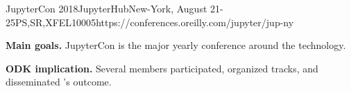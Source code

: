 \begin{event}{JupyterCon 2018}{JupyterHub}{New-York, August 21-25}{PS,SR,XFEL}{1000}{5}{https://conferences.oreilly.com/jupyter/jup-ny}

  \textbf{Main goals.} JupyterCon is the major yearly conference
  around the \Jupyter technology.

  \textbf{ODK implication.} Several \ODK members participated,
  organized tracks, and disseminated \ODK's outcome.

\end{event}
